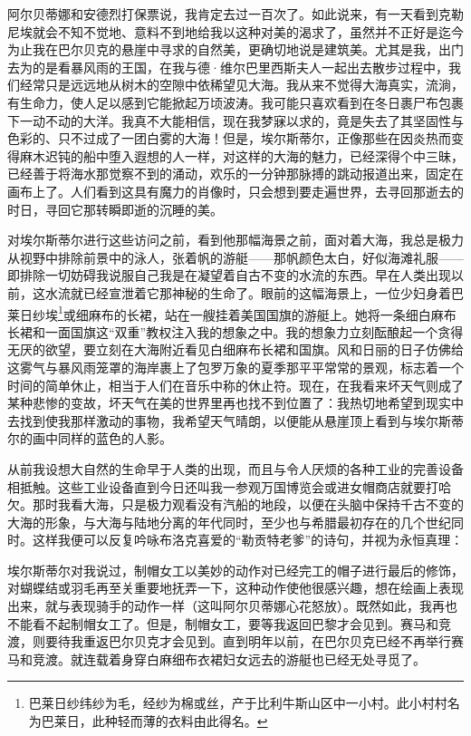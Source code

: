 \par 阿尔贝蒂娜和安德烈打保票说，我肯定去过一百次了。如此说来，有一天看到克勒尼埃就会不知不觉地、意料不到地给我以这种对美的渴求了，虽然并不正好是迄今为止我在巴尔贝克的悬崖中寻求的自然美，更确切地说是建筑美。尤其是我，出门去为的是看暴风雨的王国，在我与德·维尔巴里西斯夫人一起出去散步过程中，我们经常只是远远地从树木的空隙中依稀望见大海。我从来不觉得大海真实，流淌，有生命力，使人足以感到它能掀起万顷波涛。我可能只喜欢看到在冬日裹尸布包裹下一动不动的大洋。我真不大能相信，现在我梦寐以求的，竟是失去了其坚固性与色彩的、只不过成了一团白雾的大海！但是，埃尔斯蒂尔，正像那些在因炎热而变得麻木迟钝的船中堕入遐想的人一样，对这样的大海的魅力，已经深得个中三昧，已经善于将海水那觉察不到的涌动，欢乐的一分钟那脉搏的跳动报道出来，固定在画布上了。人们看到这具有魔力的肖像时，只会想到要走遍世界，去寻回那逝去的时日，寻回它那转瞬即逝的沉睡的美。
\par 对埃尔斯蒂尔进行这些访问之前，看到他那幅海景之前，面对着大海，我总是极力从视野中排除前景中的泳人，张着帆的游艇——那帆颜色太白，好似海滩礼服——即排除一切妨碍我说服自己我是在凝望着自古不变的水流的东西。早在人类出现以前，这水流就已经宣泄着它那神秘的生命了。眼前的这幅海景上，一位少妇身着巴莱日纱埃\footnote{巴莱日纱纬纱为毛，经纱为棉或丝，产于比利牛斯山区中一小村。此小村村名为巴莱日，此种轻而薄的衣料由此得名。}或细麻布的长裙，站在一艘挂着美国国旗的游艇上。她将一条细白麻布长裙和一面国旗这“双重”教权注入我的想象之中。我的想象力立刻酝酿起一个贪得无厌的欲望，要立刻在大海附近看见白细麻布长裙和国旗。风和日丽的日子仿佛给这雾气与暴风雨笼罩的海岸裹上了包罗万象的夏季那平平常常的景观，标志着一个时间的简单休止，相当于人们在音乐中称的休止符。现在，在我看来坏天气则成了某种悲惨的变故，坏天气在美的世界里再也找不到位置了：我热切地希望到现实中去找到使我那样激动的事物，我希望天气晴朗，以便能从悬崖顶上看到与埃尔斯蒂尔的画中同样的蓝色的人影。
\par 从前我设想大自然的生命早于人类的出现，而且与令人厌烦的各种工业的完善设备相抵触。这些工业设备直到今日还叫我一参观万国博览会或进女帽商店就要打哈欠。那时我看大海，只是极力观看没有汽船的地段，以便在头脑中保持千古不变的大海的形象，与大海与陆地分离的年代同时，至少也与希腊最初存在的几个世纪同时。这样我便可以反复吟咏布洛克喜爱的“勒贡特老爹”的诗句，并视为永恒真理：
\par 埃尔斯蒂尔对我说过，制帽女工以美妙的动作对已经完工的帽子进行最后的修饰，对蝴蝶结或羽毛再至关重要地抚弄一下，这种动作使他很感兴趣，想在绘画上表现出来，就与表现骑手的动作一样（这叫阿尔贝蒂娜心花怒放）。既然如此，我再也不能看不起制帽女工了。但是，制帽女工，要等我返回巴黎才会见到。赛马和竞渡，则要待我重返巴尔贝克才会见到。直到明年以前，在巴尔贝克已经不再举行赛马和竞渡。就连载着身穿白麻细布衣裙妇女远去的游艇也已经无处寻觅了。
